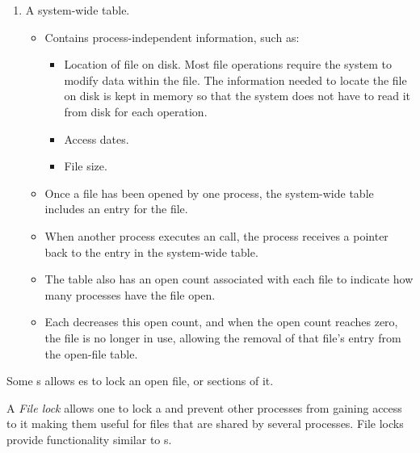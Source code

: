 \begin{enumerate}[noitemsep]
\item A system-wide table.
  \begin{itemize}[noitemsep]
  \item Contains process-independent information, such as:
    \begin{itemize}[noitemsep]
    \item Location of file on disk.
      Most file operations require the system to modify data within the file.
      The information needed to locate the file on disk is kept in memory so that the system does not have to read it from disk for each operation.
    \item Access dates.
    \item File size.
    \end{itemize}
  \item Once a file has been opened by one process, the system-wide table includes an entry for the file.
  \item When another process executes an  call, the process receives a pointer back to the entry in the system-wide table.
  \item The table also has an open count associated with each file to indicate how many processes have the file open.
  \item Each  decreases this open count, and when the open count reaches zero, the file is no longer in use, allowing the removal of that file’s entry from the open-file table.
  \end{itemize}
\end{enumerate}

Some s allows es to lock an open file, or sections of it.
\begin{definition}\label{def:File_Lock}
  A \emph{File lock} allows one  to lock a  and prevent other processes from gaining access to it making them useful for files that are shared by several processes.
  File locks provide functionality similar to s.

\end{definition}

